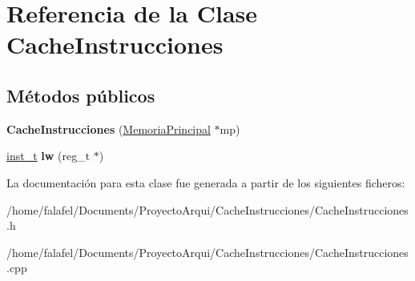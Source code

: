 \hypertarget{classCacheInstrucciones}{}\section{Referencia de la Clase Cache\+Instrucciones}
\label{classCacheInstrucciones}
\subsection*{Métodos públicos}
\begin{DoxyCompactItemize}
\item 
\mbox{\label{classCacheInstrucciones_a33342087a9014e89bce69858483f7a73}} 
{\bfseries Cache\+Instrucciones} (\hyperlink{classMemoriaPrincipal}{Memoria\+Principal} $\ast$mp)
\item 
\mbox{\label{classCacheInstrucciones_a37c7f6498709cbd259d6e302333b711d}} 
\hyperlink{structinst__t}{inst\+\_\+t} {\bfseries lw} (reg\+\_\+t $\ast$)
\end{DoxyCompactItemize}


La documentación para esta clase fue generada a partir de los siguientes ficheros\+:\begin{DoxyCompactItemize}
\item 
/home/falafel/\+Documents/\+Proyecto\+Arqui/\+Cache\+Instrucciones/Cache\+Instrucciones.\+h\item 
/home/falafel/\+Documents/\+Proyecto\+Arqui/\+Cache\+Instrucciones/Cache\+Instrucciones.\+cpp\end{DoxyCompactItemize}
